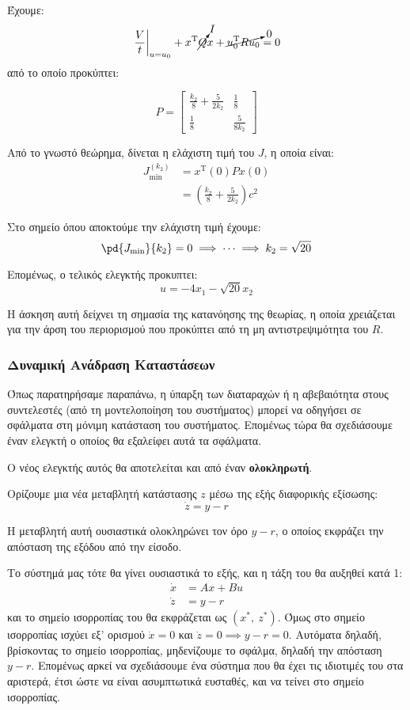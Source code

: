 \documentclass[11pt,a4paper,notitlepage,fleqn]{article}
\let\mytodo\todo
\renewcommand{\todo}[1]{\par\mytodo[inline,noline]{#1}}
\begin{document}
\begin{exercise}
	Έχουμε:
	\[
	\left.\frac{V}{t}\right|_{u=u_0}
	+x^{\mathrm T} \cancelto{I}{Q} x
	+\cancelto{0}{u_0^{\mathrm T} R u_0} = 0
	\]
	από το οποίο προκύπτει: \todo{πράξεις}
	\[
	P = \left[\begin{matrix}
	\frac{k_2}{8} + \frac{5}{2k_2} & \frac{1}{8}\\
	\frac{1}{8} & \frac{5}{8k_2}
	\end{matrix}\right]
	\]
	
	Από το γνωστό θεώρημα, δίνεται η ελάχιστη τιμή του \( J \), η οποία
	είναι:
	\begin{align*}
		J_{\min}^{(k_2)} &= x^{\mathrm{T}}(0) P x(0)\\ &=
		\left(\frac{k_2}{8} + \frac{5}{2k_2}\right)c^2
	\end{align*}
	
	Στο σημείο όπου αποκτούμε την ελάχιστη τιμή έχουμε:
	\[
	\pd{J_{\min}}{k_2} = 0 \implies \dots \implies k_2 = \sqrt{20}
	\]
	
	Επομένως, ο τελικός ελεγκτής προκυπτει:
	\[
	u  = -4x_1 - \sqrt{20}x_2
	\]
	
	Η άσκηση αυτή δείχνει τη σημασία της κατανόησης της θεωρίας, η οποία
	χρειάζεται για την άρση του περιορισμού που προκύπτει από τη
	μη αντιστρεψιμότητα του \( R \).
\end{exercise}

\subsubsection{Δυναμική Ανάδραση Καταστάσεων}
Όπως παρατηρήσαμε παραπάνω, η ύπαρξη των διαταραχών ή η αβεβαιότητα
στους συντελεστές (από τη μοντελοποίηση του συστήματος) μπορεί να
οδηγήσει σε σφάλματα στη μόνιμη κατάσταση του συστήματος. Επομένως
τώρα θα σχεδιάσουμε έναν ελεγκτή ο οποίος θα εξαλείφει αυτά τα σφάλματα.

Ο νέος ελεγκτής αυτός θα αποτελείται και από έναν \textbf{ολοκληρωτή}.

Ορίζουμε μια νέα μεταβλητή κατάστασης \( z \) μέσω της εξής διαφορικής
εξίσωσης:
\[
\dot z = y - r
\]

Η μεταβλητή αυτή ουσιαστικά ολοκληρώνει τον όρο \( y-r \), ο οποίος εκφράζει την απόσταση της εξόδου από την είσοδο.

Το σύστημά μας τότε θα γίνει ουσιαστικά το εξής, και η τάξη του θα
αυξηθεί κατά 1:
\begin{align*}
    \dot x &= Ax+Bu\\
	\dot z &= y-r
\end{align*}
και το σημείο ισορροπίας του θα εκφράζεται ως \( (x^*,\ z^*) \). Όμως
στο σημείο ισορροπίας ισχύει εξ' ορισμού \( \dot x = 0 \) και \( \dot z = 0 \implies y-r = 0 \). Αυτόματα δηλαδή, βρίσκοντας το σημείο ισορροπίας,
μηδενίζουμε το σφάλμα, δηλαδή την απόσταση \( y-r \). Επομένως
αρκεί να σχεδιάσουμε ένα σύστημα που θα έχει τις ιδιοτιμές του στα
αριστερά, έτσι ώστε να είναι ασυμπτωτικά ευσταθές, και να τείνει στο
σημείο ισορροπίας.
\end{document}
